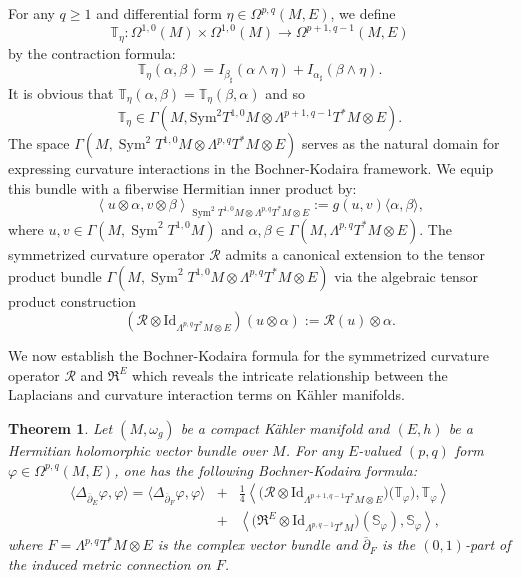 \documentclass[12pt, reqno]{amsart}
\DeclareMathOperator*{\Sym}{Sym}
\newcommand\bp{{\bar\partial}}
\theoremstyle{plain}
\newtheorem{thm}{Theorem}[section]
\theoremstyle{definition}
\newcommand{\btheorem}{\begin{thm}}
\newcommand{\etheorem}{\end{thm}}
\newcommand{\p}{\partial}
\renewcommand{\bar}{\overline}
\renewcommand{\phi}{\varphi}
\newcommand{\beq}{\begin{equation}}
\newcommand{\eeq}{\end{equation}}
\renewcommand{\bp}{\bar{\partial}}
\newcommand{\Om}{\Omega}
\newcommand{\ts}{\otimes}
\renewcommand{\>}{\rightarrow}
\renewcommand{\#}{\sharp}
\numberwithin{equation}{section} %
\begin{document}
For any $q\geq 1 $ and  differential form $\eta\in \Om^{p,q}(M, E)$,  we define
$$  \mathbb{T}_\eta: \Om^{1,0}(M)\times \Om^{1,0}(M)\>\Om^{p+1,q-1}(M,E) $$
by the contraction formula: \beq  \mathbb T_\eta(\alpha,\beta) = I_{\beta_\#}(\alpha \wedge \eta) + I_{\alpha_\#}(\beta \wedge \eta).\eeq
    It is obvious that  $\mathbb T_\eta(\alpha,\beta) = \mathbb T_\eta(\beta,\alpha)$ and so \beq  \mathbb T_\eta \in \Gamma\left(M,\mathrm{Sym}^2T^{1,0}M\otimes \Lambda^{p+1,q-1}T^*M\ts E\right).\eeq
    The space  $ \Gamma(M,\Sym^2 T^{1,0}M \otimes \Lambda^{p,q}T^*M\ts E) $ serves as the natural domain for expressing curvature interactions in the Bochner-Kodaira framework. We equip this bundle with a fiberwise ‌Hermitian inner product‌ by:
\beq  \left\langle u \otimes \alpha, v \otimes \beta \right\rangle_{\Sym^2T^{1,0}M\otimes \Lambda^{p,q}T^*M\ts E} := g(u,v) \langle \alpha ,\beta \rangle, \eeq
where  $ u, v \in \Gamma(M, \Sym^2 T^{1,0}M) $ and $ \alpha,\beta \in\Gamma\left(M, \Lambda^{p,q}T^*M\ts E\right)$.
 The symmetrized curvature operator $ \mathcal{R} $  admits a canonical extension to the tensor product bundle $ \Gamma(M,\Sym^2 T^{1,0}M \otimes \Lambda^{p,q}T^*M\ts E ) $  via the algebraic tensor product construction
\beq  (\mathcal {R} \otimes \text{Id}_{\Lambda^{p,q}T^*M\ts E})(u\otimes\alpha) := \mathcal{R}(u) \otimes \alpha. \eeq








    We now establish the  Bochner-Kodaira formula for the symmetrized curvature operator $\mathcal R$ and $\mathfrak{R}^E $ which reveals the intricate relationship between the Laplacians and curvature interaction terms on K\"ahler manifolds.


    \btheorem   \label{KBformulaVBcase}
    Let $(M,\omega_g)$ be a compact K\"ahler manifold and $(E,h)$ be a Hermitian holomorphic vector bundle over $M$. For any $E$-valued $(p,q)$ form $ \phi \in \Omega^{p,q}(M,E) $, one has the following Bochner-Kodaira formula:
\begin{eqnarray}  \langle\Delta_{\bar \p_E}\phi,\phi\rangle = \langle \Delta_{\bp_F}  \phi, \phi\rangle \nonumber&+& \frac{1}{4}\left\langle \big(\mathcal{R}\otimes \mathrm{Id}_{\Lambda^{p+1,q-1}T^*M\otimes E}\big)\big(\mathbb{T}_{\phi}\big),\mathbb{T}_{\phi} \right\rangle\\ &+& \left\langle \big(\mathfrak{R}^E \otimes \mathrm{Id}_{\Lambda^{p,q-1}T^*M}\big) \left(\mathbb{S}_\phi\right), \mathbb{S}_\phi \right\rangle,\label{VBKB} \end{eqnarray}
    where $ F = \Lambda^{p,q}T^*M \otimes E $  is the  \emph{complex} vector bundle  and $\bp_F$ is the $(0,1)$-part of the induced metric connection on $F$.
    \etheorem
\end{document}
